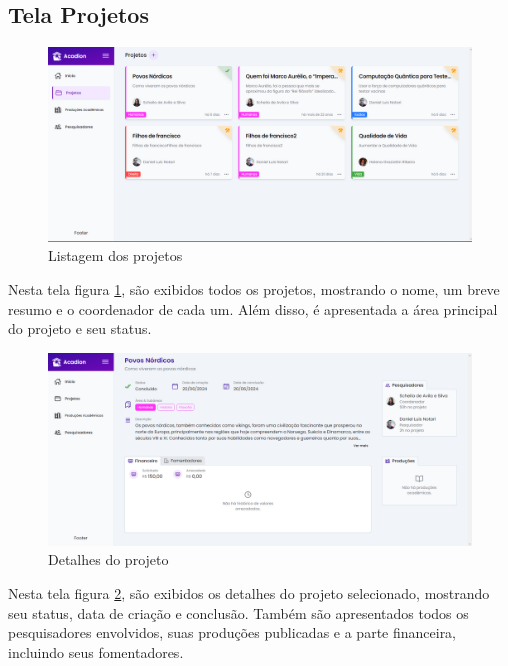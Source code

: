 \subsection{Tela Projetos}
\begin{figure}[H]
    \centering
    \includegraphics[width=1\linewidth]{figuras/TelaWebProjetos.png}
    \caption{Listagem dos projetos}
    \label{fig:projsweb}
\end{figure}
Nesta tela figura \ref{fig:projsweb}, são exibidos todos os projetos, mostrando o nome, um breve resumo e o coordenador de cada um. Além disso, é apresentada a área principal do projeto e seu status.

\begin{figure}[H]
    \centering
    \includegraphics[width=1\linewidth]{figuras/DentroDeProjetos.png}
    \caption{Detalhes do projeto}
    \label{fig:detprojsweb}
\end{figure}
Nesta tela figura \ref{fig:detprojsweb}, são exibidos os detalhes do projeto selecionado, mostrando seu status, data de criação e conclusão. Também são apresentados todos os pesquisadores envolvidos, suas produções publicadas e a parte financeira, incluindo seus fomentadores.

